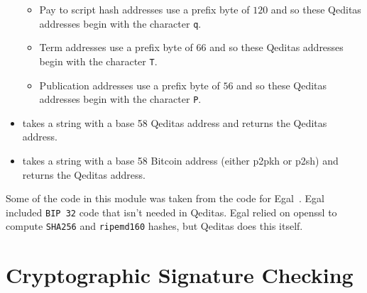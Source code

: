 \begin{itemize}
\begin{itemize}
\item Pay to script hash addresses use a prefix byte of $120$
and so these Qeditas addresses begin with the character {\tt{q}}.
\item Term addresses use a prefix byte of $66$
and so these Qeditas addresses begin with the character {\tt{T}}.
\item Publication addresses use a prefix byte of $56$
and so these Qeditas addresses begin with the character {\tt{P}}.
\end{itemize}
\item {} takes a string with a base 58 Qeditas address and returns the Qeditas address.
\item {} takes a string with a base 58 Bitcoin address (either p2pkh or p2sh) and returns the Qeditas address.
\end{itemize}
Some of the code in this module was taken from the code for Egal~\cite{Brown2014}.
Egal included {\tt{BIP 32}} code that isn't needed in Qeditas.
Egal relied on openssl to compute {\tt{SHA256}} and {\tt{ripemd160}} hashes, but Qeditas does this itself.

\section{Cryptographic Signature Checking}

